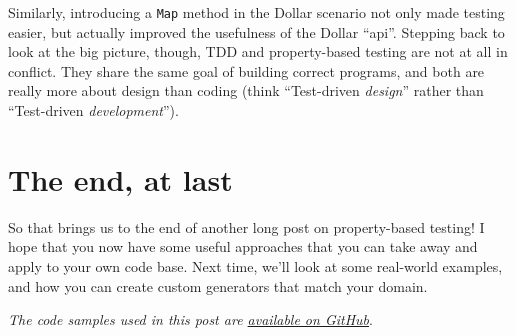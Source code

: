 Similarly, introducing a \texttt{Map} method in the Dollar scenario not
only made testing easier, but actually improved the usefulness of the
Dollar ``api''.
Stepping back to look at the big picture, though, TDD and property-based
testing are not at all in conflict. They share the same goal of building
correct programs, and both are really more about design than coding
(think ``Test-driven \emph{design}'' rather than ``Test-driven
\emph{development}'').

\section{The end, at last}\label{the-end-at-last}

So that brings us to the end of another long post on property-based
testing! 
I hope that you now have some useful approaches that you can take away
and apply to your own code base.
Next time, we'll look at some real-world examples, and how you can
create custom generators that match your domain.

\emph{The code samples used in this post are
\href{https://github.com/swlaschin/PropertyBasedTesting/blob/master/part2.fsx}{available
on GitHub}}.
